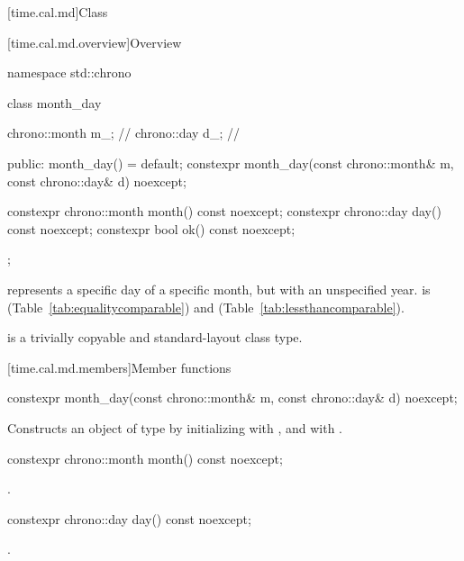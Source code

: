 [time.cal.md]{Class }

[time.cal.md.overview]{Overview}

\begin{codeblock}
namespace std::chrono {
  class month_day {
    chrono::month m_;           // \expos
    chrono::day   d_;           // \expos

  public:
    month_day() = default;
    constexpr month_day(const chrono::month& m, const chrono::day& d) noexcept;

    constexpr chrono::month month() const noexcept;
    constexpr chrono::day   day()   const noexcept;
    constexpr bool ok() const noexcept;
  };
}
\end{codeblock}

\pnum
{} represents a specific day of a specific month,
but with an unspecified year.
 is  (Table~\ref{tab:equalitycomparable})
and  (Table~\ref{tab:lessthancomparable}).

\pnum
{} is a trivially copyable and standard-layout class type.

[time.cal.md.members]{Member functions}

%
\begin{itemdecl}
constexpr month_day(const chrono::month& m, const chrono::day& d) noexcept;
\end{itemdecl}

\begin{itemdescr}
\pnum
\effects
Constructs an object of type  by
initializing  with , and  with .
\end{itemdescr}

%
\begin{itemdecl}
constexpr chrono::month month() const noexcept;
\end{itemdecl}

\begin{itemdescr}
\pnum
\returns {}.
\end{itemdescr}

%
\begin{itemdecl}
constexpr chrono::day day() const noexcept;
\end{itemdecl}

\begin{itemdescr}
\pnum
\returns {}.
\end{itemdescr}

